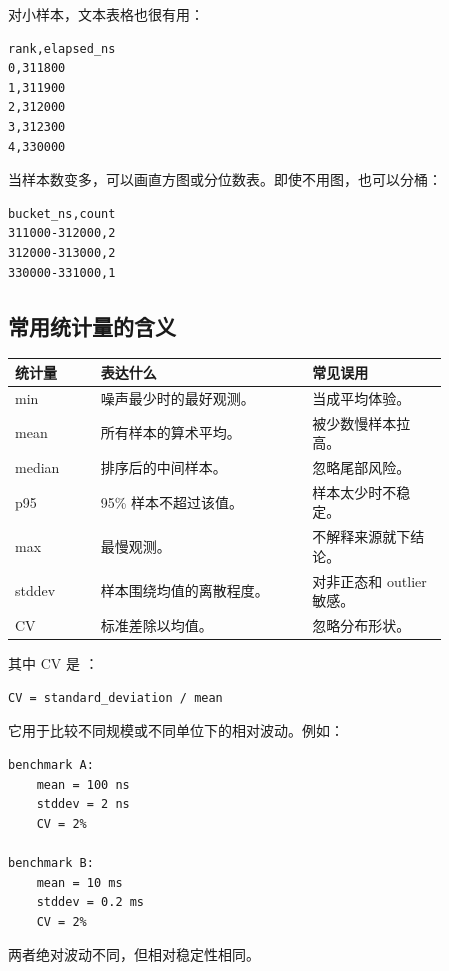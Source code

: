 对小样本，文本表格也很有用：

\begin{lstlisting}
rank,elapsed_ns
0,311800
1,311900
2,312000
3,312300
4,330000
\end{lstlisting}

当样本数变多，可以画直方图或分位数表。即使不用图，也可以分桶：

\begin{lstlisting}
bucket_ns,count
311000-312000,2
312000-313000,2
330000-331000,1
\end{lstlisting}

\subsection{常用统计量的含义}

\begin{center}
\begin{tabular}{p{0.17\linewidth}p{0.42\linewidth}p{0.27\linewidth}}
\toprule
统计量 & 表达什么 & 常见误用 \\
\midrule
min & 噪声最少时的最好观测。 & 当成平均体验。 \\
mean & 所有样本的算术平均。 & 被少数慢样本拉高。 \\
median & 排序后的中间样本。 & 忽略尾部风险。 \\
p95 & 95\% 样本不超过该值。 & 样本太少时不稳定。 \\
max & 最慢观测。 & 不解释来源就下结论。 \\
stddev & 样本围绕均值的离散程度。 & 对非正态和 outlier 敏感。 \\
CV & 标准差除以均值。 & 忽略分布形状。 \\
\bottomrule
\end{tabular}
\end{center}

其中 CV 是 ：

\begin{lstlisting}
CV = standard_deviation / mean
\end{lstlisting}

它用于比较不同规模或不同单位下的相对波动。例如：

\begin{lstlisting}
benchmark A:
    mean = 100 ns
    stddev = 2 ns
    CV = 2%

benchmark B:
    mean = 10 ms
    stddev = 0.2 ms
    CV = 2%
\end{lstlisting}

两者绝对波动不同，但相对稳定性相同。

